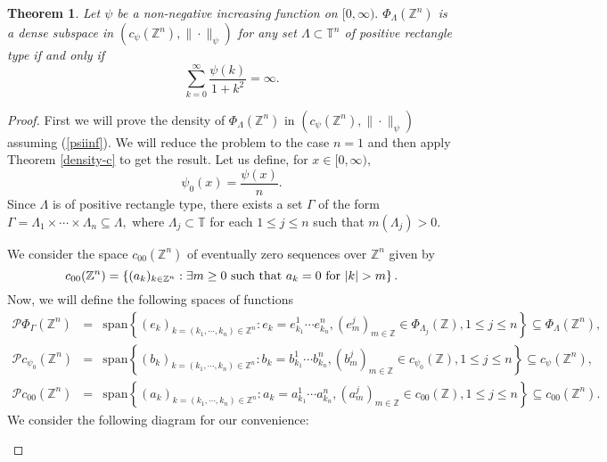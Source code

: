 \documentclass [11pt]{amsart}
\newtheorem{Thm}{Theorem}[section]
\newcommand{\T}{\mathbb T}
\newcommand{\Z}{\mathbb Z}
\newcommand{\txt} {\textmd}
\newcommand{\be} {\begin{equation}}
\newcommand{\ee} {\end{equation}}
\newcommand{\bes} {\begin{equation*}}
\newcommand{\ees} {\end{equation*}}
\newcommand{\beas} {\begin{eqnarray*}}
\newcommand{\eeas} {\end{eqnarray*}}
\numberwithin{equation}{section}
\begin{document}
\vspace{0.1in}
\begin{Thm}\label{sev-den-c}
Let $\psi$ be a non-negative increasing function on $[0,\infty).$ $\Phi_\Lambda(\Z^n)$ is a dense subspace in $(c_\psi(\Z^n),\|\cdot\|_\psi)$ for any set $\Lambda \subset \T^n$ of positive rectangle type if and only if 
	\be \label{psiinf} \sum_{k=0}^\infty\dfrac{\psi(k)}{1+k^2} = \infty. \ee
\end{Thm}
\begin{proof}
First we will prove the density of $\Phi_\Lambda(\Z^n)$ in $(c_\psi(\Z^n),\|\cdot\|_\psi)$ assuming (\ref{psiinf}). We will reduce the problem to the case $n=1$ and then apply Theorem \ref{density-c} to get the result. Let us define, for $x\in [0,\infty),$ $$\psi_0 (x)= \dfrac{\psi (x)}{n}.$$ Since $\Lambda$ is of positive rectangle type, there exists a set $\Gamma$ of the form $\Gamma = \Lambda_1 \times \cdots \times \Lambda_n \subseteq \Lambda,$ where $\Lambda_j \subset \T$ for each $1 \leq j \leq n$ such that $m(\Lambda_j)>0.$

We consider the space $c_{00}(\Z^n)$ of eventually zero sequences over $\Z^n$ given by  
\bes c_{00}(\Z^n)=\left\{ (a_k)_{k\in \Z^n}: \exists m \geq 0 \txt{ such that } a_k=0 \txt{ for } |k|>m \right\}. \ees 
Now, we will define the following spaces of functions
\beas 
\mathcal{P}\Phi_{\Gamma}(\Z^n) &=& \text{span}\left\{ (e_k)_{k  =(k_1, \cdots, k_n) \in \Z^n} :  e_k=e^1_{k_1}\cdots e^n_{k_n}, (e^j_{m})_{m\in \Z}\in \Phi_{\Lambda_j}(\Z), 1\leq j \leq n  \right\} \subseteq  \Phi_{\Lambda}(\Z^n), \\
\mathcal{P}c_{\psi_0}(\Z^n) &=& \text{span} \left\{ (b_k)_{k  =(k_1, \cdots, k_n) \in \Z^n} :  b_k=b^1_{k_1}\cdots b^n_{k_n}, (b^j_{m})_{m\in \Z}\in c_{\psi_0}(\Z), 1\leq j \leq n  \right\} \subseteq  c_\psi(\Z^n), \\
\mathcal{P}c_{00}(\Z^n) &=& \text{span} \left\{ (a_k)_{k =(k_1, \cdots, k_n) \in \Z^n} :  a_k=a^1_{k_1}\cdots a^n_{k_n}, (a^j_m)_{m\in \Z}\in c_{00}(\Z), 1\leq j \leq n  \right\} \subseteq  c_{00}(\Z^n).
\eeas
We consider the following diagram for our convenience:
\begin{center}
\end{center}


\end{proof}
\end{document}
